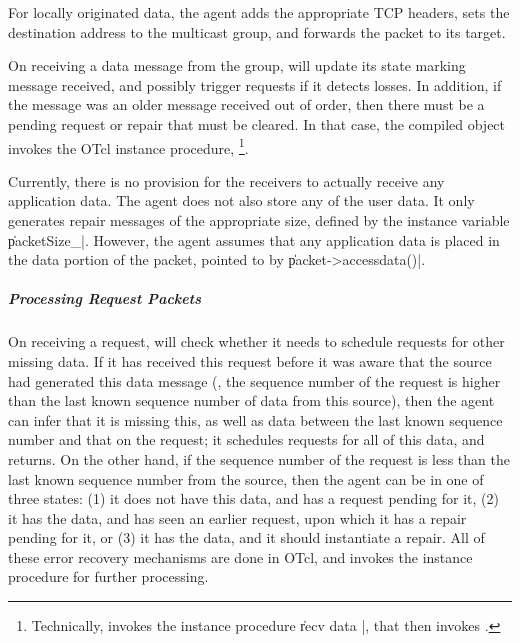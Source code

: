 \documentclass{article}
\begin{document}
For locally originated data, 
the agent adds the appropriate TCP headers,
sets the destination address to the multicast group, 
and forwards the packet to its target.

On receiving a data message from the group,
will update its state marking message
 received,
and possibly trigger requests if it detects losses.
In addition, if the message was an older message received out of order,
then there must be a pending request or repair that must be cleared.
In that case, the compiled object invokes the OTcl instance procedure,
%
\footnote{Technically,
   invokes the instance procedure
  \|recv data  |,
  that then invokes .}.

Currently, there is no provision for the receivers
to actually receive any application data.
The agent does not also store any of the user data.
It only generates repair messages of the appropriate size,
defined by the instance variable \|packetSize\_|.
However, the agent assumes that any application data
is placed in the data portion of the packet,
pointed to by \|packet->accessdata()|.

\subparagraph{Processing Request Packets}
On receiving a request, 
will check whether it needs to schedule requests for other missing data.
If it has received this request
before it was aware that the source had generated this data message
(\ie, the sequence number of the request is higher than 
the last known sequence number of data from this source),
then the agent can infer that it is missing this, as well as
data between the last known sequence number and that on the request;
it schedules requests for all of this data, and returns.
On the other hand, if the sequence number of the request is less
than the last known sequence number from the source,
then the agent can be in one of three states:
(1) it does not have this data, and has a request pending for it,
(2) it has the data, and has seen an earlier request,
    upon which it has a repair pending for it, or
(3) it has the data, and it should instantiate a repair.
All of these error recovery mechanisms are done in OTcl,
and  invokes the instance procedure
for further processing.
\end{document}
